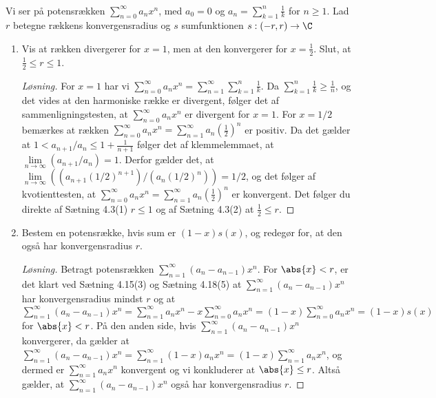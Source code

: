\setcounter{section}{3}
\begin{opg}\hfill\\
	Vi ser på potensrækken $ \sum_{n=0}^{\infty}a_n x^n $, med $ a_0=0 $ og $ a_n=\sum_{k=1}^{n}\frac1k $ for $ n\geq1 $. Lad $ r $ betegne rækkens konvergensradius og $ s $ sumfunktionen $ s: (-r,r)\to \C $
\begin{enumerate}
    \item Vis at rækken divergerer for $ x=1 $, men at den konvergerer for $ x=\frac{1}{2} $. Slut, at $ \frac{1}{2}\leq r\leq1 $.
    \ifanswers
    \begin{proof}[Løsning]
    	For $ x=1 $ har vi $ \sum_{n=0}^{\infty}a_n x^n=\sum_{n=1}^{\infty}\sum_{k=1}^{n}\frac{1}{k} $. Da $ \sum_{k=1}^{n}\frac{1}{k}\geq \frac1n $, og det vides at den harmoniske række er divergent, følger det af sammenligningstesten, at $ \sum_{n=0}^{\infty}a_n x^n $ er divergent for $ x=1 $. For $ x=1/2 $ bemærkes at rækken $ \sum_{n=0}^{\infty}a_n x^n=\sum_{n=1}^{\infty}a_n\left(\frac{1}{2}\right)^n $ er positiv. Da det gælder at $ 1<a_{n+1}/a_n\leq1+\frac{1}{n+1} $ følger det af klemmelemmaet, at $ \lim\limits_{n\to\infty}(a_{n+1}/a_n)=1 $. Derfor gælder det, at\\ $ \lim\limits_{n\to\infty}\left((a_{n+1}(1/2)^{n+1})/(a_n(1/2)^n)\right)=1/2 $, og det følger af kvotienttesten, at $ \sum_{n=0}^{\infty}a_n x^n=\sum_{n=1}^{\infty}a_n\left(\frac{1}{2}\right)^n $ er konvergent. Det følger du direkte af Sætning 4.3(1)  $ r\leq 1 $ og af Sætning 4.3(2) at $ \frac12\leq r $.
    \end{proof}
    \fi
    \item Bestem en potensrække, hvis sum er $ (1-x)s(x) $, og redegør for, at den også har konvergensradius $ r $.
    \ifanswers
    \begin{proof}[Løsning]
    	Betragt potensrækken $ \sum_{n=1}^{\infty}(a_n-a_{n-1})x^n $. For $ \abs{x}<r $, er det klart ved Sætning 4.15(3) og Sætning 4.18(5) at $ \sum_{n=1}^{\infty}(a_n-a_{n-1})x^n $ har konvergensradius mindst $ r $ og at $ \sum_{n=1}^{\infty}(a_n-a_{n-1})x^n=\sum_{n=1}^{\infty}a_nx^n-x\sum_{n=0}^{\infty}a_nx^n=(1-x)\sum_{n=0}^{\infty}a_nx^n=(1-x)s(x) $ for $ \abs{x}< r $.
    	På den anden side, hvis $ \sum_{n=1}^{\infty}(a_n-a_{n-1})x^n $ konvergerer, da gælder at $ \sum_{n=1}^{\infty}(a_n-a_{n-1})x^n=\sum_{n=1}^{\infty}(1-x)a_nx^n=(1-x)\sum_{n=1}^{\infty}a_nx^n $, og dermed er $\sum_{n=1}^{\infty}a_nx^n  $ konvergent og vi konkluderer at $ \abs{x}\leq r $. Altså gælder, at $ \sum_{n=1}^{\infty}(a_n-a_{n-1})x^n $ også har konvergensradius $ r $.

\end{proof}
\end{enumerate}
\end{opg}
